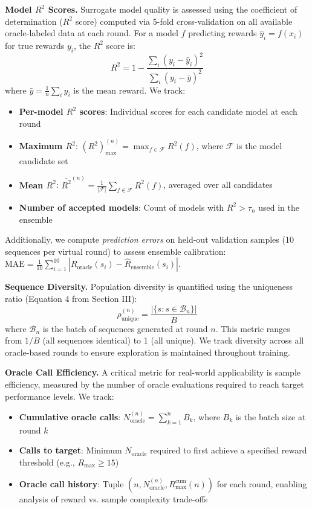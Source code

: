 \documentclass[conference]{IEEEtran}
\begin{document}
\textbf{Model $R^2$ Scores.} Surrogate model quality is assessed using the coefficient of determination ($R^2$ score) computed via 5-fold cross-validation on all available oracle-labeled data at each round. For a model $f$ predicting rewards $\hat{y}_i = f(x_i)$ for true rewards $y_i$, the $R^2$ score is:
%
\begin{equation}
R^2 = 1 - \frac{\sum_{i}(y_i - \hat{y}_i)^2}{\sum_{i}(y_i - \bar{y})^2}
\end{equation}
%
where $\bar{y} = \frac{1}{n}\sum_{i}y_i$ is the mean reward. We track:
\begin{itemize}
    \item \textbf{Per-model $R^2$ scores}: Individual scores for each candidate model at each round
    \item \textbf{Maximum $R^2$}: ${(R^2)}_{\max}^{(n)} = \max_{f \in \mathcal{F}} R^2(f)$, where $\mathcal{F}$ is the model candidate set
    \item \textbf{Mean $R^2$}: $\overline{R^2}^{(n)} = \frac{1}{|\mathcal{F}|}\sum_{f \in \mathcal{F}} R^2(f)$, averaged over all candidates
    \item \textbf{Number of accepted models}: Count of models with $R^2 > \tau_n$ used in the ensemble
\end{itemize}

Additionally, we compute \textit{prediction errors} on held-out validation samples (10 sequences per virtual round) to assess ensemble calibration: $\text{MAE} = \frac{1}{10}\sum_{i=1}^{10}|R_{\text{oracle}}(s_i) - \hat{R}_{\text{ensemble}}(s_i)|$.

\textbf{Sequence Diversity.} Population diversity is quantified using the uniqueness ratio (Equation 4 from Section III):
%
\begin{equation}
\rho_{\text{unique}}^{(n)} = \frac{|\{s : s \in \mathcal{B}_n\}|}{B}
\end{equation}
%
where $\mathcal{B}_n$ is the batch of sequences generated at round $n$. This metric ranges from $1/B$ (all sequences identical) to 1 (all unique). We track diversity across all oracle-based rounds to ensure exploration is maintained throughout training.

\textbf{Oracle Call Efficiency.} A critical metric for real-world applicability is sample efficiency, measured by the number of oracle evaluations required to reach target performance levels. We track:
\begin{itemize}
    \item \textbf{Cumulative oracle calls}: $N_{\text{oracle}}^{(n)} = \sum_{k=1}^{n} B_k$, where $B_k$ is the batch size at round $k$
    \item \textbf{Calls to target}: Minimum $N_{\text{oracle}}$ required to first achieve a specified reward threshold (e.g., $R_{\max} \geq 15$)
    \item \textbf{Oracle call history}: Tuple $(n, N_{\text{oracle}}^{(n)}, R_{\max}^{\text{cum}}(n))$ for each round, enabling analysis of reward vs. sample complexity trade-offs
\end{itemize}
\end{document}
